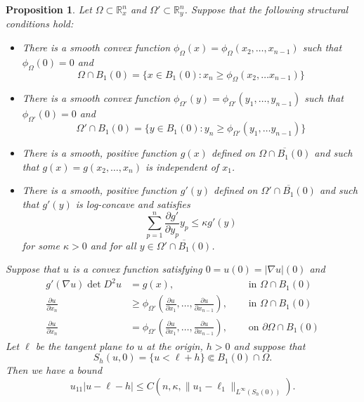 \documentclass[12pt,reqno]{amsart}
\newtheorem{prop}{Proposition}[section]
\newcommand{\del}{\partial}
\numberwithin{equation}{section}
\begin{document}
\begin{prop}\label{prop: VeryGenPog}
Let $\Omega\subset \mathbb{R}^{n}_{x}$ and $ \Omega' \subset \mathbb{R}_y^n$.  Suppose that the following structural conditions hold: 
\begin{itemize}
    \item[(i)] There is a smooth convex function $\phi_\Omega(x) =\phi_\Omega(x_2,\ldots, x_{n-1})$ such that $\phi_\Omega(0)=0$ and
    \[
    \Omega \cap B_1(0) = \{ x\in B_1(0) : x_n \geq \phi_\Omega(x_2,\ldots x_{n-1})\}
    \]
    \item[(ii)] There is a smooth convex function $\phi_{\Omega'}(y)=\phi_{\Omega'}(y_1,\ldots, y_{n-1})$ such that $\phi_{\Omega'}(0)=0$ and
    \[
    \Omega'\cap B_1(0) =  \{ y\in B_1(0) : y_n \geq \phi_{\Omega'}(y_1,\ldots y_{n-1})\}
    \]
    \item[(iii)] There is a smooth, positive function $g(x)$ defined on $\overline{\Omega\cap B_1(0)} $ and such that $g(x)=g(x_2,\ldots,x_n)$ is independent of $x_1$.
    \item[(iv)]There is a smooth, positive function $g'(y)$ defined on $\overline{\Omega'\cap B_1(0)} $ and such that $g'(y)$ is log-concave and satisfies
    \[
    \sum_{p=1}^{n}\frac{\del g'}{\del y_p}y_p\leq \kappa g'(y)
    \]
    for some $\kappa >0$ and for all $y\in \overline{\Omega'\cap B_1(0)}$.
\end{itemize}
Suppose that $u$ is a convex function satisfying $0 = u(0) = |\nabla u|(0)$ and 
\[
\begin{aligned}
g'(\nabla u)\det D^2u &= g(x),& \quad \text{ in } \Omega \cap B_1(0)\\
\frac{\del u}{\del x_n} &\geq \phi_{\Omega'}(\frac{\del u}{\del x_1}, \ldots, \frac{\del u}{\del x_{n-1}}),& \quad \text{ in } \Omega \cap B_1(0)\\
\frac{\del u}{\del x_n} &= \phi_{\Omega'}(\frac{\del u}{\del x_1}, \ldots, \frac{\del u}{\del x_{n-1}}),& \quad \text{ on } \del\Omega \cap B_1(0)
\end{aligned}
\]
Let $\ell$ be the tangent plane to $u$ at the origin, $h>0$ and suppose that
\[
S_{h}(u,0) = \{u< \ell+h\} \Subset B_1(0)\cap \Omega.
\]
Then we have a bound
\[
u_{11}|u-\ell-h| \leq C(n,\kappa, \|u_{1}-\ell_{1}\|_{L^{\infty}(S_{h}(0))}). 
\]
\end{prop}
\end{document}
